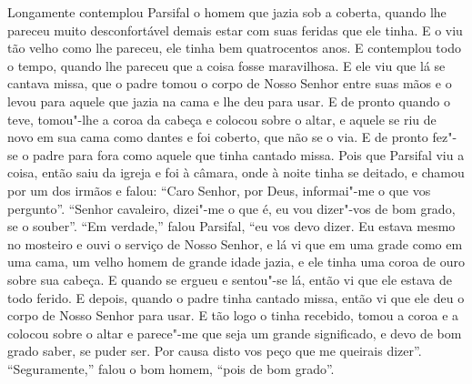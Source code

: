 Longamente contemplou Parsifal o homem que jazia sob a coberta, quando lhe
pareceu muito desconfortável demais estar com suas feridas que ele tinha. E o
viu tão velho como lhe pareceu, ele tinha bem quatrocentos anos. E
contemplou todo o tempo, quando lhe pareceu que a coisa fosse maravilhosa. E
ele viu que lá se cantava missa, que o padre tomou o corpo de Nosso Senhor
entre suas mãos e o levou para aquele que jazia na cama e lhe deu para usar. E
de pronto quando o teve, tomou"-lhe a coroa da cabeça e colocou sobre o altar, e
aquele se riu de novo em sua cama como dantes e foi coberto, que não se o via.
E de pronto fez"-se o padre para fora como aquele que tinha cantado missa. 
Pois que Parsifal viu a coisa, então saiu da igreja e foi à câmara, onde
à noite tinha se deitado, e chamou por um dos irmãos e falou: “Caro Senhor, por
Deus, informai"-me o que vos pergunto”. “Senhor cavaleiro, dizei"-me o que é, eu
vou dizer"-vos de bom grado, se o souber”. “Em verdade,” falou Parsifal, “eu
vos devo dizer. Eu estava mesmo no mosteiro e ouvi o serviço de Nosso Senhor, e
lá vi que em uma grade como em uma cama, um velho homem de grande idade jazia,
e ele tinha uma coroa de ouro sobre sua cabeça. E quando se ergueu e sentou"-se
lá, então vi que ele estava de todo ferido. E depois, quando o padre tinha
cantado missa, então vi que ele deu o corpo de Nosso Senhor para usar. E tão
logo o tinha recebido, tomou a coroa e a colocou sobre o altar e parece"-me que
seja um grande significado, e devo de bom grado saber, se puder ser. Por causa
disto vos peço que me queirais dizer”. “Seguramente,” falou o bom homem, “pois
de bom grado”.

